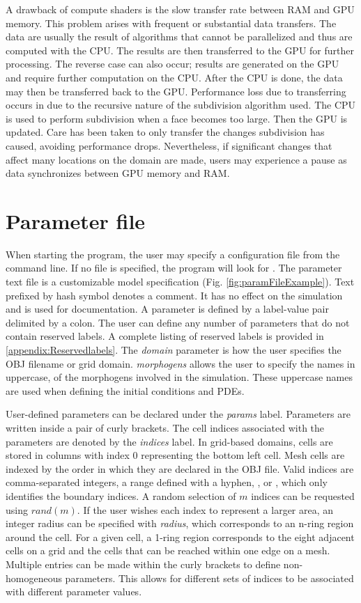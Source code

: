 A drawback of compute shaders is the slow transfer rate between RAM and GPU memory. This problem arises with frequent or substantial data transfers. The data are usually the result of algorithms that cannot be parallelized and thus are computed with the CPU. The results are then transferred to the GPU for further processing. The reverse case can also occur; results are generated on the GPU and require further computation on the CPU. After the CPU is done, the data may then be transferred back to the GPU. Performance loss due to transferring occurs in \ProgramName{} due to the recursive nature of the subdivision algorithm used. The CPU is used to perform subdivision when a face becomes too large. Then the GPU is updated. Care has been taken to only transfer the changes subdivision has caused, avoiding performance drops. Nevertheless, if significant changes that affect many locations on the domain are made, users may experience a pause as data synchronizes between GPU memory and RAM. 

\section{Parameter file}
When starting the program, the user may specify a configuration file from the command line. If no file is specified, the program will look for . The parameter text file is a customizable model specification (Fig. \ref{fig:paramFileExample}). Text prefixed by hash symbol denotes a comment. It has no effect on the simulation and is used for documentation. A parameter is defined by a label-value pair delimited by a colon. The user can define any number of parameters that do not contain reserved labels. A complete listing of reserved labels is provided in \ref{appendix:Reservedlabels}. The \textit{domain} parameter is how the user specifies the OBJ filename or grid domain. \textit{morphogens} allows the user to specify the names in uppercase, of the morphogens involved in the simulation. These uppercase names are used when defining the initial conditions and PDEs.

User-defined parameters can be declared under the \textit{params} label. Parameters are written inside a pair of curly brackets. The cell indices associated with the parameters are denoted by the \textit{indices} label. In grid-based domains, cells are stored in columns with index 0 representing the bottom left cell. Mesh cells are indexed by the order in which they are declared in the OBJ file. Valid indices are comma-separated integers, a range defined with a hyphen, , or , which only identifies the boundary indices. A random selection of $m$ indices can be requested using $rand(m)$. If the user wishes each index to represent a larger area, an integer radius can be specified with \textit{radius}, which corresponds to an n-ring region around the cell. For a given cell, a 1-ring region corresponds to the eight adjacent cells on a grid and the cells that can be reached within one edge on a mesh. Multiple entries can be made within the curly brackets to define non-homogeneous parameters. This allows for different sets of indices to be associated with different parameter values.

